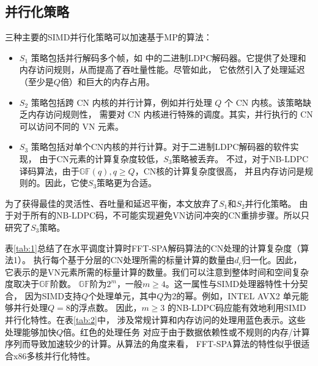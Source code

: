 \documentclass{cjc}
\begin{document}
\subsection{并行化策略}

三种主要的SIMD并行化策略可以加速基于MP的算法：
\begin{itemize}
  \item $S_1$ 策略包括并行解码多个帧，如\cite{gal_high-throughput_2016,gronroos_efficient_2012}
  中的二进制LDPC解码器。它提供了处理和内存访问规则，从而提高了吞吐量性能。尽管如此，
  它依然引入了处理延迟（至少是$Q$倍）和巨大的内存占用。
  \item $S_2$ 策略包括跨 CN 内核的并行计算，例如并行处理 $Q$ 个 CN 内核。该策略缺乏内存访问规则性，
  需要对 CN 内核进行特殊的调度。其实，并行执行的 CN 可以访问不同的 VN 元素。
  \item $S_3$ 策略包括对单个CN内核的并行计算。对于二进制LDPC解码器的软件实现，
  由于CN元素的计算复杂度较低，$S_3$策略被丢弃\cite{gal_high-throughput_2016}。
  不过，对于NB-LDPC译码算法，由于$\mathbb{GF}(q),q\geq{Q}$，CN核的计算复杂度很高，
  并且内存访问是规则的。因此，它使$S_3$策略更为合适。
\end{itemize}

  为了获得最佳的灵活性、吞吐量和延迟平衡，本文放弃了$S_1$和$S_2$并行化策略。
  由于对于所有的NB-LDPC码，不可能实现避免VN访问冲突的CN重排步骤。所以只研究了$S_3$策略。

  表\ref{tab:1}总结了在水平调度计算时FFT-SPA解码算法的CN处理的计算复杂度（算法1）。
  执行每个基于分层的CN处理所需的标量计算的数量由$d_c$归一化。因此，
  它表示的是VN元素所需的标量计算的数量。我们可以注意到整体时间和空间复杂度取决于$\mathbb{GF}$阶数。
  $\mathbb{GF}$阶为$2^m$，一般$m\geq4$。这一属性与SIMD处理器特性十分契合，
  因为SIMD支持$Q$个处理单元，其中$Q$为2的幂。例如，INTEL AVX2 单元能够并行处理$Q=8$的浮点数。
  因此，$m\geq3$ 的NB-LDPC码应能有效地利用SIMD并行化特性。在表\ref{tab:2}中，
  涉及常规计算和内存访问的处理用蓝色表示。这些处理能够加快$Q$倍。红色的处理任务
  对应于由于数据依赖性或不规则的内存/计算序列而导致加速较少的计算。从算法的角度来看，
  FFT-SPA算法的特性似乎很适合x86多核并行化特性。
\end{document}
